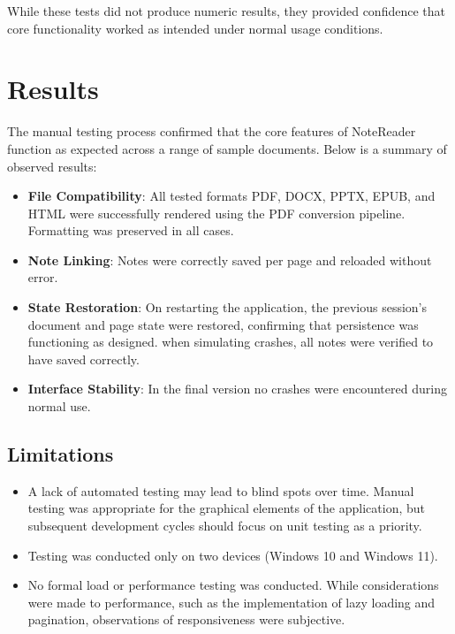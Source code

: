 While these tests did not produce numeric results, they provided confidence that core functionality worked as intended under normal usage conditions.

\section{Results}

The manual testing process confirmed that the core features of NoteReader function as expected across a range of sample documents. Below is a summary of observed results:

\begin{itemize}
    \item \textbf{File Compatibility}: All tested formats PDF, DOCX, PPTX, EPUB, and HTML were successfully rendered using the PDF conversion pipeline. Formatting was preserved in all cases.
    \item \textbf{Note Linking}: Notes were correctly saved per page and reloaded without error. 
    \item \textbf{State Restoration}: On restarting the application, the previous session's document and page state were restored, confirming that persistence was functioning as designed. when simulating crashes, all notes were verified to have saved correctly. 
    \item \textbf{Interface Stability}: In the final version no crashes were encountered during normal use.
\end{itemize}

\subsection{Limitations}
\begin{itemize}
    \item A lack of automated testing may lead to blind spots over time. Manual testing was appropriate for the graphical elements of the application, but subsequent development cycles should focus on unit testing as a priority. 
    \item Testing was conducted only on two devices (Windows 10 and Windows 11).
    \item No formal load or performance testing was conducted. While considerations were made to performance, such as the implementation of lazy loading and pagination, observations of responsiveness were subjective.
\end{itemize}